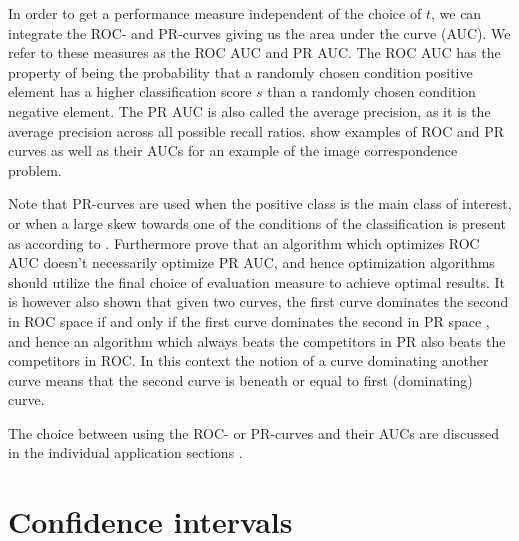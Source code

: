 \documentclass[thesis.tex]{subfiles}
\begin{document}
In order to get a performance measure independent of the choice of $t$, we can integrate the ROC- and PR-curves giving us the area under the curve (AUC). We refer to these measures as the ROC AUC and PR AUC. The ROC AUC has the property of being the probability that a randomly chosen condition positive element has a higher classification score $s$ than a randomly chosen condition negative element. The PR AUC is also called the average precision, as it is the average precision across all possible recall ratios.  show examples of ROC and PR curves as well as their AUCs for an example of the image correspondence problem.

Note that PR-curves are used when the positive class is the main class of interest, or when a large skew towards one of the conditions of the classification is present as according to \citet{davis2006relationship}. Furthermore \citet{davis2006relationship} prove that an algorithm which optimizes ROC AUC doesn't necessarily optimize PR AUC, and hence optimization algorithms should utilize the final choice of evaluation measure to achieve optimal results. It is however also shown that given two curves, the first curve dominates the second in ROC space if and only if the first curve dominates the second in PR space \cite[Theorem 3.2]{davis2006relationship}, and hence an algorithm which always beats the competitors in PR also beats the competitors in ROC. In this context the notion of a curve dominating another curve means that the second curve is beneath or equal to first (dominating) curve.

The choice between using the ROC- or PR-curves and their AUCs are discussed in the individual application sections .
%
\section{Confidence intervals}
\label{sec:confidenceIntervals}
\end{document}
